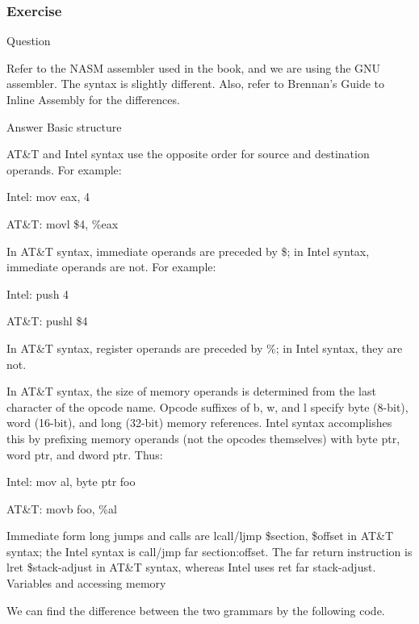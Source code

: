 \subsubsection{Exercise }
\begin{flushleft}
{\Large Question}
\end{flushleft}

Refer to the NASM assembler used in the book, and we are using the GNU assembler. The syntax is slightly different.
Also, refer to Brennan's Guide to Inline Assembly for the differences.

\begin{flushleft}
{\Large Answer}
\medskip
{\large Basic structure}

AT\&T and Intel syntax use the opposite order for source and destination operands. For example:

\quad Intel: mov eax, 4

\quad AT\&T: movl \$4, \%eax

In AT\&T syntax, immediate operands are preceded by \$; in Intel syntax, immediate operands are not. For example:

\quad Intel: push 4

\quad AT\&T: pushl \$4

In AT\&T syntax, register operands are preceded by \%; in Intel syntax, they are not.

In AT\&T syntax, the size of memory operands is determined from the last character of the opcode name. Opcode suffixes of b, w, and l specify byte (8-bit), word (16-bit), and long (32-bit) memory references. Intel syntax accomplishes this by prefixing memory operands (not the opcodes themselves) with byte ptr, word ptr, and dword ptr. Thus:

\quad Intel: mov al, byte ptr foo

\quad AT\&T: movb foo, \%al

Immediate form long jumps and calls are lcall/ljmp \$section, \$offset in AT\&T syntax; the Intel syntax is call/jmp far section:offset. The far return instruction is lret \$stack-adjust in AT\&T syntax, whereas Intel uses ret far stack-adjust.
\medskip
{\large Variables and accessing memory}

We can find the difference between the two grammars by the following code.


\end{flushleft}
